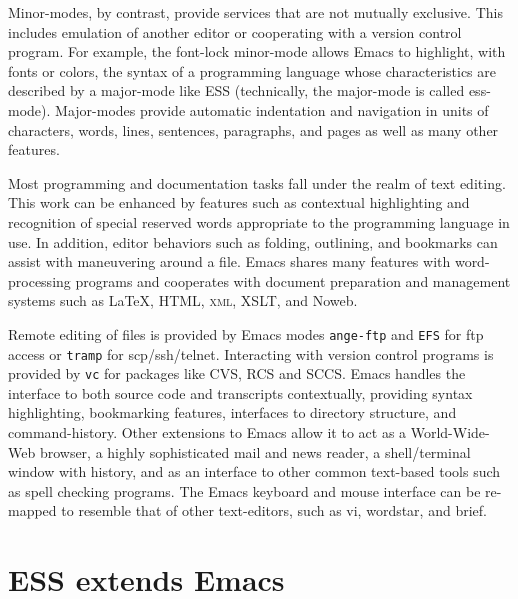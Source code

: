 \documentclass{article}
\newcommand{\stexttt}[1]{{\small\texttt{#1}}}
\begin{document}
Minor-modes, by contrast, provide
services that are not mutually exclusive.  This includes emulation of
another editor or cooperating with a version control program.  For
example, the font-lock minor-mode allows Emacs to highlight, with
fonts or colors, the syntax of a programming language whose
characteristics are described by a major-mode like ESS (technically,
the major-mode is called ess-mode).  Major-modes
provide automatic indentation and navigation in units of characters,
words, lines, sentences, paragraphs, and pages as well as many other
features.

Most programming and documentation tasks fall under the realm of text
editing.  This work can be enhanced by features such as contextual
highlighting and recognition of special reserved words appropriate to
the programming language in use.  In addition, editor behaviors such
as folding, outlining, and bookmarks can assist with maneuvering
around a file.  Emacs shares many features with word-processing
programs and cooperates with document preparation and management
systems such as \LaTeX, HTML, \textsc{xml}, XSLT, and Noweb.


Remote editing of files is provided by Emacs modes \stexttt{ange-ftp} and 
\stexttt{EFS} for ftp access or \stexttt{tramp} for scp/ssh/telnet.
Interacting with version control programs is provided by \stexttt{vc} 
for packages like CVS, RCS and SCCS.  Emacs handles the
interface to both source code and transcripts contextually, providing
syntax highlighting, bookmarking features, interfaces to directory
structure, and command-history.  Other extensions to Emacs allow it to
act as a World-Wide-Web browser, a highly sophisticated mail and news
reader, a shell/terminal window with history, and as an interface to
other common text-based tools such as spell checking programs.  The
Emacs keyboard and mouse interface can be re-mapped to resemble that
of other text-editors, such as vi, wordstar, and brief.


\section{ESS extends Emacs}
\label{sec:ess-extends-emacs}
\end{document}
